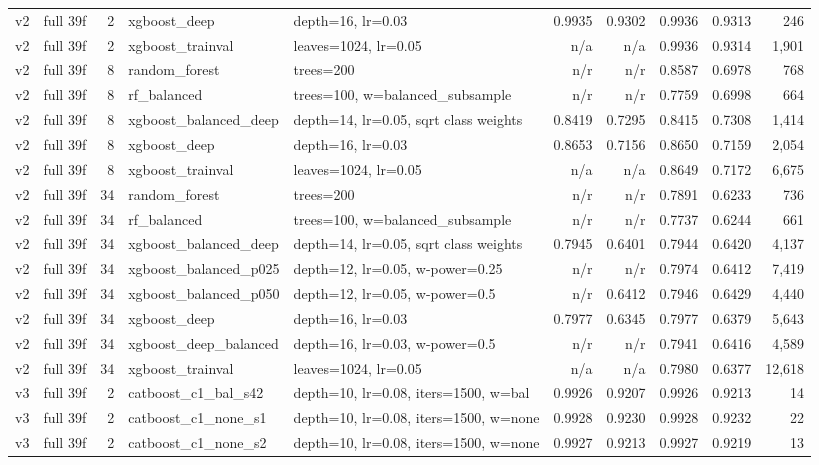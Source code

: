 {\begin{longtable}{llrp{3.2cm}p{4.4cm}rrrrr}
v2 & full 39f & 2 & xgboost\_deep & depth=16, lr=0.03 & 0.9935 & 0.9302 & 0.9936 & 0.9313 & 246 \\
v2 & full 39f & 2 & xgboost\_trainval & leaves=1024, lr=0.05 & n/a & n/a & 0.9936 & 0.9314 & 1,901 \\
v2 & full 39f & 8 & random\_forest & trees=200 & n/r & n/r & 0.8587 & 0.6978 & 768 \\
v2 & full 39f & 8 & rf\_balanced & trees=100, w=balanced\_subsample & n/r & n/r & 0.7759 & 0.6998 & 664 \\
v2 & full 39f & 8 & xgboost\_balanced\_deep & depth=14, lr=0.05, sqrt class weights & 0.8419 & 0.7295 & 0.8415 & 0.7308 & 1,414 \\
v2 & full 39f & 8 & xgboost\_deep & depth=16, lr=0.03 & 0.8653 & 0.7156 & 0.8650 & 0.7159 & 2,054 \\
v2 & full 39f & 8 & xgboost\_trainval & leaves=1024, lr=0.05 & n/a & n/a & 0.8649 & 0.7172 & 6,675 \\
v2 & full 39f & 34 & random\_forest & trees=200 & n/r & n/r & 0.7891 & 0.6233 & 736 \\
v2 & full 39f & 34 & rf\_balanced & trees=100, w=balanced\_subsample & n/r & n/r & 0.7737 & 0.6244 & 661 \\
v2 & full 39f & 34 & xgboost\_balanced\_deep & depth=14, lr=0.05, sqrt class weights & 0.7945 & 0.6401 & 0.7944 & 0.6420 & 4,137 \\
v2 & full 39f & 34 & xgboost\_balanced\_p025 & depth=12, lr=0.05, w-power=0.25 & n/r & n/r & 0.7974 & 0.6412 & 7,419 \\
v2 & full 39f & 34 & xgboost\_balanced\_p050 & depth=12, lr=0.05, w-power=0.5 & n/r & 0.6412 & 0.7946 & 0.6429 & 4,440 \\
v2 & full 39f & 34 & xgboost\_deep & depth=16, lr=0.03 & 0.7977 & 0.6345 & 0.7977 & 0.6379 & 5,643 \\
v2 & full 39f & 34 & xgboost\_deep\_balanced & depth=16, lr=0.03, w-power=0.5 & n/r & n/r & 0.7941 & 0.6416 & 4,589 \\
v2 & full 39f & 34 & xgboost\_trainval & leaves=1024, lr=0.05 & n/a & n/a & 0.7980 & 0.6377 & 12,618 \\
v3 & full 39f & 2 & catboost\_c1\_bal\_s42 & depth=10, lr=0.08, iters=1500, w=bal & 0.9926 & 0.9207 & 0.9926 & 0.9213 & 14 \\
v3 & full 39f & 2 & catboost\_c1\_none\_s1 & depth=10, lr=0.08, iters=1500, w=none & 0.9928 & 0.9230 & 0.9928 & 0.9232 & 22 \\
v3 & full 39f & 2 & catboost\_c1\_none\_s2 & depth=10, lr=0.08, iters=1500, w=none & 0.9927 & 0.9213 & 0.9927 & 0.9219 & 13 \\

\end{longtable}}
